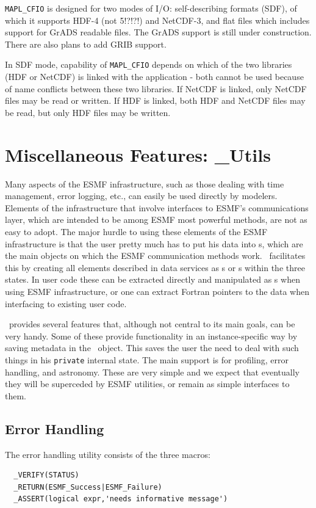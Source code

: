 {\tt MAPL\_CFIO} is designed for two modes of I/O: self-describing formats
(SDF), of which it supports HDF-4 (not 5!?!?!) and NetCDF-3, and flat files
which includes support for GrADS readable files. The GrADS support is still
under construction. There are also plans to add GRIB support. 

In SDF mode, capability of {\tt MAPL\_CFIO} depends on which of the two
libraries (HDF or NetCDF) is linked with the application - both cannot
be used because of name conflicts between these two libraries. If NetCDF is
linked, only NetCDF  files may be read or written. If HDF is linked, both HDF 
and NetCDF files may be read, but only HDF files may be written.


\section{Miscellaneous Features: \ggn\_{Utils}}

Many aspects of the ESMF infrastructure, such as those dealing with
time management, error logging, etc., can easily be used directly by
modelers. Elements of the infrastructure that involve interfaces to
ESMF's communications layer, which are intended to be among ESMF most
powerful methods, are not as easy to adopt. The major hurdle to using
these elements of the ESMF infrastructure is that the user pretty much
has to put his data into \fld s, which are the main objects on
which the ESMF communication methods work. \ggn\  facilitates this by
creating all elements described in data services as \fld s or \bdl s
within the three states. In user code these can be extracted directly
and manipulated as \fld s when using ESMF infrastructure,
or one can extract Fortran pointers to the data when interfacing to 
existing user code. 


\ggn\  provides several features that, although not central to its main 
goals, can be very handy. Some of these provide
functionality in an instance-specific way by saving metadata in the
\ggn\  object. This saves the user the need to deal with such things in
his \texttt{private} internal state. The main support is for profiling, error
handling, and astronomy. These are very simple and we expect that
eventually they will be superceded by ESMF utilities, or remain as
simple interfaces to them.

\subsection{Error Handling}
The error handling utility consists of the three macros:
\begin{verbatim}
  _VERIFY(STATUS)
  _RETURN(ESMF_Success|ESMF_Failure)
  _ASSERT(logical expr,'needs informative message')
\end{verbatim}

